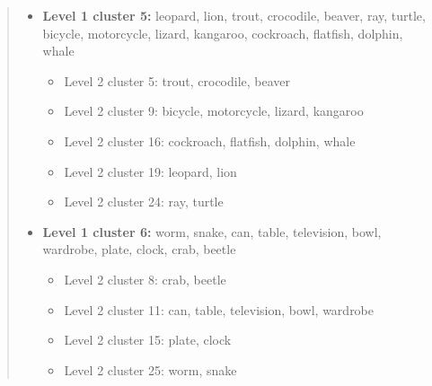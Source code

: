 \begin{quote}
\begin{itemize}
\begin{itemize}
\setlength{\itemsep}{0.1em}
\item Level 2 cluster 4: wolf, raccoon, bear, seal, tiger, skunk, porcupine, elephant
\item Level 2 cluster 7: sunflower, bee, tulip, dinosaur, poppy
\item Level 2 cluster 10: rabbit, bottle, fox, hamster
\item Level 2 cluster 12: cattle, camel
\item Level 2 cluster 20: mouse, shrew, otter
\item Level 2 cluster 21: mushroom, snail
\end{itemize}
\item \textbf{Level 1 cluster 5:} leopard, lion, trout, crocodile, beaver, ray, turtle, bicycle, motorcycle, lizard, kangaroo, cockroach, flatfish, dolphin, whale
\begin{itemize}
\setlength{\itemsep}{0.1em}
\item Level 2 cluster 5: trout, crocodile, beaver
\item Level 2 cluster 9: bicycle, motorcycle, lizard, kangaroo
\item Level 2 cluster 16: cockroach, flatfish, dolphin, whale
\item Level 2 cluster 19: leopard, lion
\item Level 2 cluster 24: ray, turtle
\end{itemize}
\item \textbf{Level 1 cluster 6:} worm, snake, can, table, television, bowl, wardrobe, plate, clock, crab, beetle
\begin{itemize}
\setlength{\itemsep}{0.1em}
\item Level 2 cluster 8: crab, beetle
\item Level 2 cluster 11: can, table, television, bowl, wardrobe
\item Level 2 cluster 15: plate, clock
\item Level 2 cluster 25: worm, snake
\end{itemize}
\end{itemize}
\end{quote}
